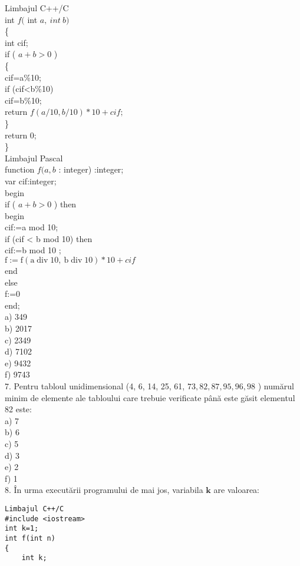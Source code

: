 Limbajul C++/C\\
int $f($ int $a, ~ i n t ~ b) ~$\\
\{\\
int cif;\\
if ( $a+b>0$ )\\
\{\\
cif=a\%10;\\
if (cif<b\%10)\\
cif=b\%10;\\
return $f(a / 10, b / 10) * 10+c i f ;$\\
\}\\
return 0;\\
\}\\
Limbajul Pascal\\
function $f(a, b$ : integer) :integer;\\
var cif:integer;\\
begin\\
if ( $a+b>0$ ) then\\
begin\\
cif:=a mod 10;\\
if (cif < b mod 10) then\\
cif:=b mod 10 ;\\
$\mathrm{f}:=\mathrm{f}(\mathrm{a} \operatorname{div} 10, \mathrm{~b} \operatorname{div} 10) * 10+c i f$\\
end\\
else\\
f:=0\\
end;\\
a) 349\\
b) 2017\\
c) 2349\\
d) 7102\\
e) 9432\\
f) 9743\\
7. Pentru tabloul unidimensional (4, 6, 14, 25, 61, $73,82,87,95,96,98$ ) numărul minim de elemente ale tabloului care trebuie verificate până este găsit elementul 82 este:\\
a) 7\\
b) 6\\
c) 5\\
d) 3\\
e) 2\\
f) 1\\
8. În urma executării programului de mai jos, variabila $\mathbf{k}$ are valoarea:

\begin{verbatim}
Limbajul C++/C
#include <iostream>
int k=1;
int f(int n)
{
    int k;
\end{verbatim}

